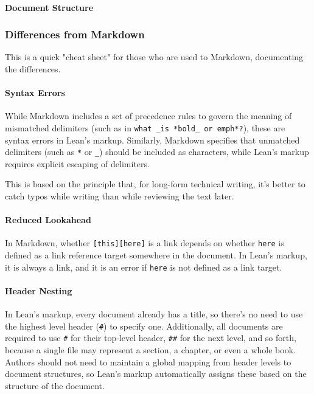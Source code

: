 \documentclass{memoir}
\begin{document}
\paragraph{Document Structure}



\subsubsection{Differences from Markdown}

This is a quick "cheat sheet" for those who are used to Markdown, documenting the differences.



\paragraph{Syntax Errors}

While Markdown includes a set of precedence rules to govern the meaning of mismatched delimiters (such as in \verb|what _is *bold_ or emph*?|), these are syntax errors in Lean's markup.
Similarly, Markdown specifies that unmatched delimiters (such as \verb|*| or \verb|_|) should be included as characters, while Lean's markup requires explicit escaping of delimiters.

This is based on the principle that, for long-form technical writing, it's better to catch typos while writing than while reviewing the text later.



\paragraph{Reduced Lookahead}

In Markdown, whether \verb|[this][here]| is a link depends on whether \verb|here| is defined as a link reference target somewhere in the document.
In Lean's markup, it is always a link, and it is an error if \verb|here| is not defined as a link target.



\paragraph{Header Nesting}

In Lean's markup, every document already has a title, so there's no need to use the highest level header (\verb|#|) to specify one.
Additionally, all documents are required to use \verb|#| for their top-level header, \verb|##| for the next level, and so forth, because a single file may represent a section, a chapter, or even a whole book.
Authors should not need to maintain a global mapping from header levels to document structures, so Lean's markup automatically assigns these based on the structure of the document.
\end{document}
